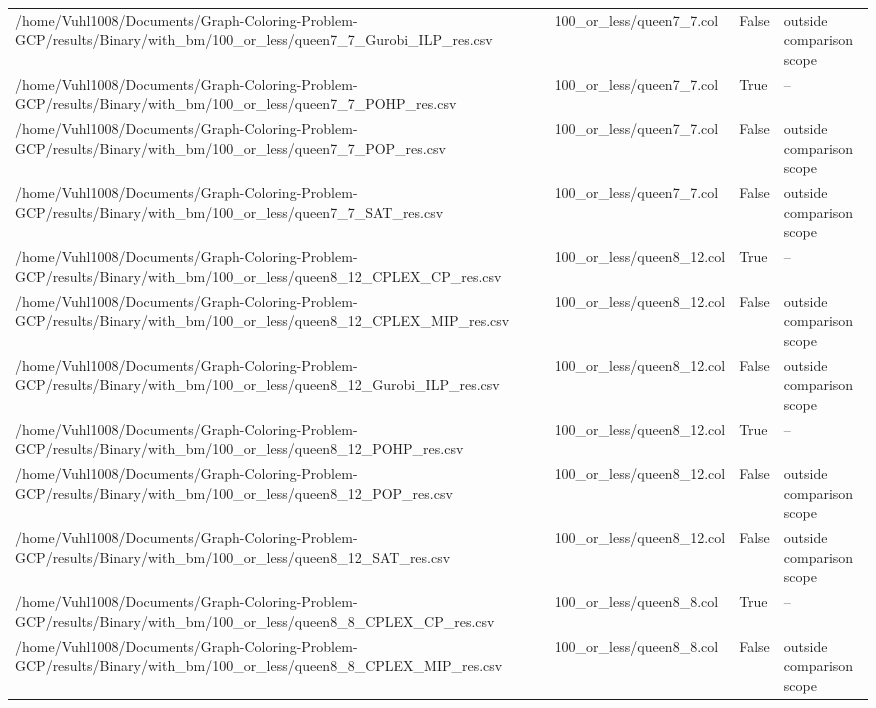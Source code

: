 \begin{table}[htbp]
\begin{tabular}{llll}
/home/Vuhl1008/Documents/Graph-Coloring-Problem-GCP/results/Binary/with\_bm/100\_or\_less/queen7\_7\_Gurobi\_ILP\_res.csv & 100\_or\_less/queen7\_7.col & False & outside comparison scope \\
/home/Vuhl1008/Documents/Graph-Coloring-Problem-GCP/results/Binary/with\_bm/100\_or\_less/queen7\_7\_POHP\_res.csv & 100\_or\_less/queen7\_7.col & True & -- \\
/home/Vuhl1008/Documents/Graph-Coloring-Problem-GCP/results/Binary/with\_bm/100\_or\_less/queen7\_7\_POP\_res.csv & 100\_or\_less/queen7\_7.col & False & outside comparison scope \\
/home/Vuhl1008/Documents/Graph-Coloring-Problem-GCP/results/Binary/with\_bm/100\_or\_less/queen7\_7\_SAT\_res.csv & 100\_or\_less/queen7\_7.col & False & outside comparison scope \\
/home/Vuhl1008/Documents/Graph-Coloring-Problem-GCP/results/Binary/with\_bm/100\_or\_less/queen8\_12\_CPLEX\_CP\_res.csv & 100\_or\_less/queen8\_12.col & True & -- \\
/home/Vuhl1008/Documents/Graph-Coloring-Problem-GCP/results/Binary/with\_bm/100\_or\_less/queen8\_12\_CPLEX\_MIP\_res.csv & 100\_or\_less/queen8\_12.col & False & outside comparison scope \\
/home/Vuhl1008/Documents/Graph-Coloring-Problem-GCP/results/Binary/with\_bm/100\_or\_less/queen8\_12\_Gurobi\_ILP\_res.csv & 100\_or\_less/queen8\_12.col & False & outside comparison scope \\
/home/Vuhl1008/Documents/Graph-Coloring-Problem-GCP/results/Binary/with\_bm/100\_or\_less/queen8\_12\_POHP\_res.csv & 100\_or\_less/queen8\_12.col & True & -- \\
/home/Vuhl1008/Documents/Graph-Coloring-Problem-GCP/results/Binary/with\_bm/100\_or\_less/queen8\_12\_POP\_res.csv & 100\_or\_less/queen8\_12.col & False & outside comparison scope \\
/home/Vuhl1008/Documents/Graph-Coloring-Problem-GCP/results/Binary/with\_bm/100\_or\_less/queen8\_12\_SAT\_res.csv & 100\_or\_less/queen8\_12.col & False & outside comparison scope \\
/home/Vuhl1008/Documents/Graph-Coloring-Problem-GCP/results/Binary/with\_bm/100\_or\_less/queen8\_8\_CPLEX\_CP\_res.csv & 100\_or\_less/queen8\_8.col & True & -- \\
/home/Vuhl1008/Documents/Graph-Coloring-Problem-GCP/results/Binary/with\_bm/100\_or\_less/queen8\_8\_CPLEX\_MIP\_res.csv & 100\_or\_less/queen8\_8.col & False & outside comparison scope \\

\end{tabular}
\end{table}
